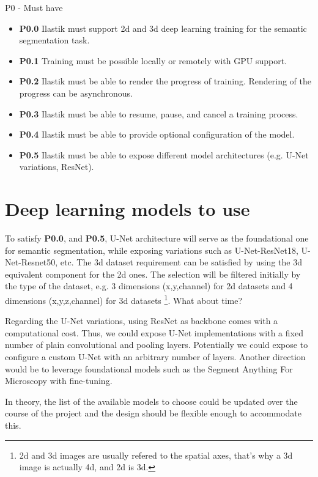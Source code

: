 \documentclass[12pt, a4paper]{article}
\begin{document}
P0 - Must have
\begin{itemize}
    \item \textbf{P0.0} Ilastik must support 2d and 3d deep learning training for the semantic segmentation task.
    \item \textbf{P0.1} Training must be possible locally or remotely with GPU support.
    \item \textbf{P0.2} Ilastik must be able to render the progress of training. Rendering of the progress can be asynchronous.
    \item \textbf{P0.3} Ilastik must be able to resume, pause, and cancel a training process.
    \item \textbf{P0.4} Ilastik must be able to provide optional configuration of the model.
    \item \textbf{P0.5} Ilastik must be able to expose different model architectures (e.g. U-Net variations, ResNet).
\end{itemize}


\section{Deep learning models to use}
\label{sec:deep_models}

To satisfy \textbf{P0.0}, and \textbf{P0.5}, U-Net architecture \cite{ronnebergerUNetConvolutionalNetworks2015} will serve as the foundational one for semantic segmentation, while exposing variations such as U-Net-ResNet18, U-Net-Resnet50, etc. The 3d dataset requirement can be satisfied by using the 3d equivalent component for the 2d ones. The selection will be filtered initially by the type of the dataset, e.g. 3 dimensions (x,y,channel) for 2d datasets  and 4 dimensions (x,y,z,channel) for 3d datasets \footnote{2d and 3d images are usually refered to the spatial axes, that's why a 3d image is actually 4d, and 2d is 3d.}. What about time? 

Regarding the U-Net variations, using ResNet as backbone comes with a computational cost. Thus, we could expose U-Net implementations with a fixed number of plain convolutional and pooling layers. Potentially we could expose to configure a custom U-Net with an arbitrary number of layers. Another direction would be to leverage foundational models such as the Segment Anything For Microscopy with fine-tuning.

In theory, the list of the available models to choose could be updated over the course of the project and the design should be flexible enough to accommodate this.
\end{document}
